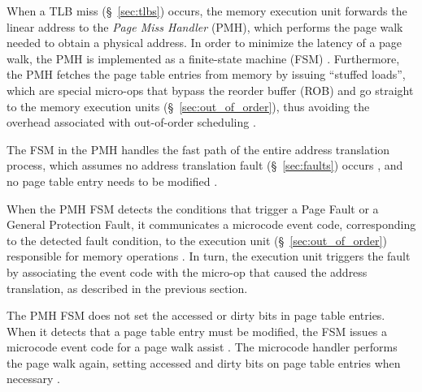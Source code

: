 When a TLB miss (\S~\ref{sec:tlbs}) occurs, the memory execution unit forwards
the linear address to the \textit{Page Miss Handler} (PMH), which performs the
page walk needed to obtain a physical address. In order to minimize the latency
of a page walk, the PMH is implemented as a finite-state machine (FSM)
\cite{hildesheim2014ptm, raikin2014tlb}. Furthermore, the PMH fetches the
page table entries from memory by issuing ``stuffed loads'', which are special
micro-ops that bypass the reorder buffer (ROB) and go straight to the memory
execution units (\S~\ref{sec:out_of_order}), thus avoiding the overhead
associated with out-of-order scheduling
\cite{intel1997pmh, intel1997microspace, hildesheim2014ptm}.


The FSM in the PMH handles the fast path of the entire address translation
process, which assumes no address translation fault (\S~\ref{sec:faults})
occurs
\cite{intel1996dtlb, intel1997pmh, intel1999exceptions, intel1999events}, and
no page table entry needs to be modified \cite{intel1997pmh}.

When the PMH FSM detects the conditions that trigger a Page Fault or a General
Protection Fault, it communicates a microcode event code, corresponding to the
detected fault condition, to the execution unit (\S~\ref{sec:out_of_order})
responsible for memory operations \cite{intel1996dtlb, intel1997pmh,
intel1999exceptions, intel1999events}. In turn, the execution unit triggers the
fault by associating the event code with the micro-op that caused the address
translation, as described in the previous section.

The PMH FSM does not set the accessed or dirty bits in page table entries. When
it detects that a page table entry must be modified, the FSM issues a microcode
event code for a page walk assist \cite{intel1997pmh}. The microcode handler
performs the page walk again, setting accessed and dirty bits on page table
entries when necessary \cite{intel1997pmh}.

